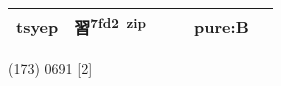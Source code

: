 \documentclass[14pt,a4paper]{scrartcl}
\begin{document}
\begin{longtable}[c]{@{}llllll@{}}
\begin{minipage}[t]{0.14\columnwidth}\raggedright\strut
tsyep
\strut\end{minipage} &
\begin{minipage}[t]{0.14\columnwidth}\raggedright\strut
習\textsuperscript{7fd2~zip}
\strut\end{minipage} &
\begin{minipage}[t]{0.14\columnwidth}\raggedright\strut
\strut\end{minipage} &
\begin{minipage}[t]{0.14\columnwidth}\raggedright\strut
\strut\end{minipage} &
\begin{minipage}[t]{0.14\columnwidth}\raggedright\strut
pure:B
\strut\end{minipage}\tabularnewline
\bottomrule
\end{longtable}

(173) 0691 {[}2{]}
\end{document}
